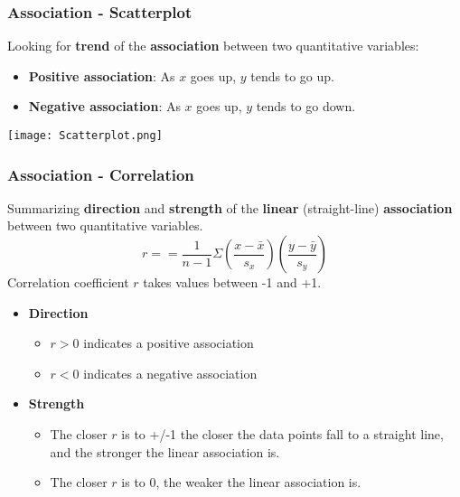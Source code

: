 \documentclass[11pt, xcolor=x11names,compress]{beamer}
\begin{document}
\begin{frame}[fragile,t]
\frametitle{Association - Scatterplot}\label{association}
Looking for \textbf{trend} of the \textbf{association} between two quantitative variables:
\begin{itemize}
    \item \textbf{Positive association}: As $x$ goes up, $y$ tends to go up.
    \item \textbf{Negative association}: As $x$ goes up, $y$ tends to go down.
\end{itemize}
\begin{center}
    \texttt{[image: Scatterplot.png]}
\end{center}
\hyperlink{b1)}{}
\end{frame}

\begin{frame}[fragile,t]
\frametitle{Association - Correlation}
Summarizing \textbf{direction} and \textbf{strength} of the \textbf{linear} (straight-line) \textbf{association} between two quantitative variables. 
\begin{equation}
    r==\frac{1}{n-1} \Sigma\left(\frac{x-\bar{x}}{s_{x}}\right)\left(\frac{y-\bar{y}}{s_{y}}\right)
\end{equation}
Correlation coefficient $r$ takes values between -1 and +1.
\begin{itemize}
    \item \textbf{Direction}
    \begin{itemize}
        \item $r>0$ indicates a positive association
        \item $r<0$ indicates a negative association
    \end{itemize}
    \item \textbf{Strength}
    \begin{itemize}
        \item The closer $r$ is to +/-1 the closer the data points fall to a straight line, and the stronger the linear association is.
        \item The closer $r$ is to 0, the weaker the linear association is.
    \end{itemize} 
\end{itemize}
\hyperlink{b2)}{}
\end{frame}
\end{document}
